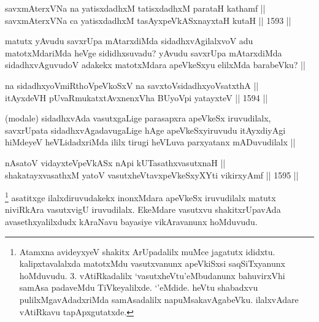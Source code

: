 
\begin{shl}
savxmAterxVNa na yatisxdadhxM tatisxdadhxM parataH kathamf || \\
savxmAterxVNa ca yatisxdadhxM tasAyxpeVkASx\s nayxtaH kutaH ||  1593 ||  
\end{shl}

\begin{artha}
matutx yAvudu savxrUpa mAtarxdiMda sidadhxvAgilalxvoV adu matotxMdariMda heVge sididhxsuvadu? yAvudu savxrUpa mAtarxdiMda sidadhxvAguvudoV adakekx matotxMdara apeVkeSxyu elilxMda barabeVku? ||
\end{artha}


\begin{shl}
na sidadhxyoVmiRthoV\s peVkoSxV na savxtoV\s sidadhxyoVsatxthA  || \\
itAyxdeVH pUvaRmukatxtAvxnenxVha BUyoV\s pi yatayxteV ||  1594 ||  
\end{shl}

\begin{artha}
(modale) sidadhxvAda vasutxgaLige parasapxra apeVkeSx iruvudilalx, savxrUpata sidadhxvAgadavugaLige hAge apeVkeSxyiruvudu itAyxdiyAgi hiMdeyeV heVLidadxriMda ililx tirugi heVLuva parxyatanx mADuvudilalx ||
\end{artha}


\begin{shl}
nAsatoV vidayxteV\s peVkASx nApi kUTasathxvasutxnaH || \\
shakatayxvasathxM yatoV vasutxheVtavxpeVkeSxyXYti vikirxyAmf ||  1595 ||  
\end{shl}

\begin{artha}
\footnote{Atamxna avideyxyeV shakitx ArUpadalilx muMce jagatutx ididxtu. kalipxtavalalxda matotxMdu vasutxvanunx apeVkiSxsi saqSiTxyanunx hoMduvudu. 3. vAtiRkadalilx `vasutxheVtu'eMbudanunx bahuvirxVhi samAsa padaveMdu TiVkeyalilxde. `\stext'eMdide. heVtu shabadxvu pulilxMgavAdadxriMda samAsadalilx napuMsakavAgabeVku. ilalxvAdare vAtiRkavu tapApxgutatxde.}
asatitxge ilalxdiruvudakekx inonxMdara apeVkeSx iruvudilalx matutx niviRkAra vasutxvigU iruvudilalx. EkeMdare vasutxvu shakitxrUpavAda avasethxyalilxdudx kAraNavu bayasiye vikAravanunx hoMduvudu.
\end{artha}


